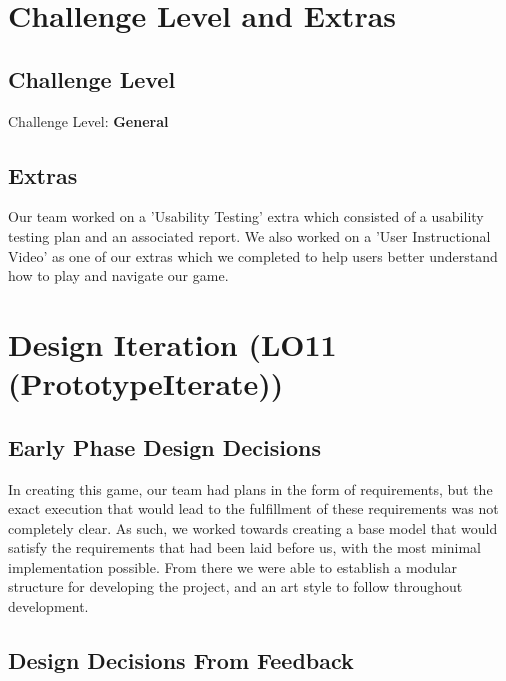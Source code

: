 \documentclass{article}
\begin{document}
\section{Challenge Level and Extras}

\subsection{Challenge Level}

Challenge Level: \textbf{General}

\subsection{Extras}

Our team worked on a 'Usability Testing' extra which consisted of a usability testing plan and an associated report. We also worked on a 'User Instructional Video' as one of our extras which we completed to help users better understand how to play and navigate our game.

\section{Design Iteration (LO11 (PrototypeIterate))}

\subsection{Early Phase Design Decisions}

In creating this game, our team had plans in the form of requirements, but the exact execution that would lead to the fulfillment of these requirements was not completely clear. As such, we worked towards creating a base model that would satisfy the requirements that had been laid before us, with the most minimal implementation possible. From there we were able to establish a modular structure for developing the project, and an art style to follow throughout development.

\subsection{Design Decisions From Feedback}
\end{document}
